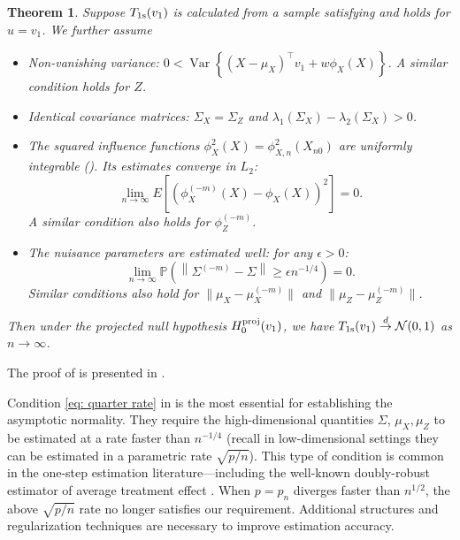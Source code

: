 \documentclass[11pt]{article}
\newtheorem{theorem}{Theorem}[section]
\begin{document}
\begin{theorem}
\label{th: one step}
    Suppose $T_{\rm 1s}(v_1)$ is calculated from a sample satisfying  and  holds for $u = v_1$. We further assume 
    \begin{itemize}
         \item Non-vanishing variance: $0 < \operatorname{Var}\left\{\left(X-\mu_X\right)^{\top} v_1+w \phi_X(X)\right\}$. A similar condition holds for $Z$.
          \item Identical covariance matrices: $\Sigma_X = \Sigma_Z$ and $\lambda_1(\Sigma_X) - \lambda_2(\Sigma_X) > 0$.
          \item The squared influence functions $\phi_X^2(X) = \phi^2_{X,n}(X_{n0})$ are uniformly integrable (). 
          Its estimates converge in $L_2$: \begin{equation}\label{eq: nuisance moment convergence}\lim_{n\rightarrow\infty} E[(\phi^{(-m)}_X(X) - \phi_X(X))^2] = 0.
          \end{equation}
          A similar condition also holds for $\phi^{(-m)}_Z$. 
         \item The nuisance parameters are estimated well: for any $\epsilon > 0$:
         \begin{equation}\label{eq: quarter rate} \lim_{n\rightarrow\infty}\mathbb{P}\left(\left\|\Sigma^{(-m)}-\Sigma\right\| \geq \epsilon n^{-1 / 4}\right) = 0.
         \end{equation}
         Similar conditions also hold for $\|\mu_X-\mu_X^{(-m)}\| $ and $\|\mu_Z-\mu_Z^{(-m)}\|$.
    \end{itemize}
Then under the projected null hypothesis $H_0^{\rm proj}(v_1)$, we have $T_{\rm 1s}(v_1) \stackrel{d}{\rightarrow} \mathcal{N}(0,1)$ as $n\rightarrow\infty$. 
\end{theorem}

The proof of 
is presented in .

Condition \eqref{eq: quarter rate} in  is the most essential for establishing the asymptotic normality. They require the high-dimensional quantities $\Sigma$, $\mu_X,\mu_Z$ to be estimated at a rate faster than $n^{-1/4}$ (recall in low-dimensional settings they can be estimated in a parametric rate $\sqrt{p/n}$). This type of condition is common in the one-step estimation literature---including the well-known doubly-robust estimator of average treatment effect \citep{glynn2010introduction}. When $p = p_n$ diverges faster than $n^{1/2}$, the above $\sqrt{p/n}$ rate no longer satisfies our requirement. Additional structures and regularization techniques are necessary to improve estimation accuracy.
\end{document}
